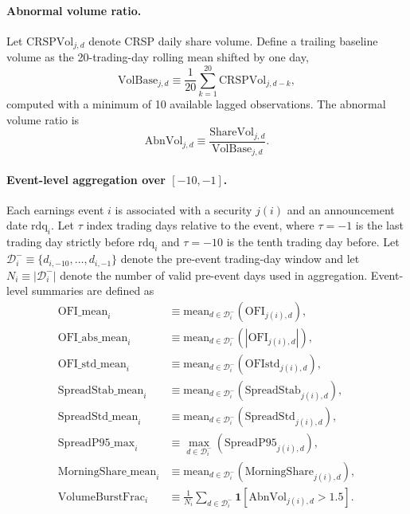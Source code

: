 \paragraph{Abnormal volume ratio.}
Let $\mathrm{CRSPVol}_{j,d}$ denote CRSP daily share volume.
Define a trailing baseline volume as the 20-trading-day rolling mean shifted by one day,
\begin{equation}
\mathrm{VolBase}_{j,d} \equiv \frac{1}{20}\sum_{k=1}^{20} \mathrm{CRSPVol}_{j,d-k},
\end{equation}
computed with a minimum of 10 available lagged observations.
The abnormal volume ratio is
\begin{equation}
\mathrm{AbnVol}_{j,d} \equiv \frac{\mathrm{ShareVol}_{j,d}}{\mathrm{VolBase}_{j,d}}.
\end{equation}

\paragraph{Event-level aggregation over $[-10,-1]$.}
Each earnings event $i$ is associated with a security $j(i)$ and an announcement date $\mathrm{rdq}_i$.
Let $\tau$ index trading days relative to the event, where $\tau=-1$ is the last trading day strictly before $\mathrm{rdq}_i$ and $\tau=-10$ is the tenth trading day before.
Let $\mathcal{D}_i^{-}\equiv\{d_{i,-10},\ldots,d_{i,-1}\}$ denote the pre-event trading-day window and let $N_i\equiv|\mathcal{D}_i^{-}|$ denote the number of valid pre-event days used in aggregation.
Event-level summaries are defined as
\begin{equation}
\begin{aligned}
\mathrm{OFI\_mean}_i &\equiv \mathrm{mean}_{d\in\mathcal{D}_i^{-}}\!\left(\mathrm{OFI}_{j(i),d}\right), \\
\mathrm{OFI\_abs\_mean}_i &\equiv \mathrm{mean}_{d\in\mathcal{D}_i^{-}}\!\left(|\mathrm{OFI}_{j(i),d}|\right), \\
\mathrm{OFI\_std\_mean}_i &\equiv \mathrm{mean}_{d\in\mathcal{D}_i^{-}}\!\left(\mathrm{OFIstd}_{j(i),d}\right), \\
\mathrm{SpreadStab\_mean}_i &\equiv \mathrm{mean}_{d\in\mathcal{D}_i^{-}}\!\left(\mathrm{SpreadStab}_{j(i),d}\right), \\
\mathrm{SpreadStd\_mean}_i &\equiv \mathrm{mean}_{d\in\mathcal{D}_i^{-}}\!\left(\mathrm{SpreadStd}_{j(i),d}\right), \\
\mathrm{SpreadP95\_max}_i &\equiv \max_{d\in\mathcal{D}_i^{-}}\!\left(\mathrm{SpreadP95}_{j(i),d}\right), \\
\mathrm{MorningShare\_mean}_i &\equiv \mathrm{mean}_{d\in\mathcal{D}_i^{-}}\!\left(\mathrm{MorningShare}_{j(i),d}\right), \\
\mathrm{VolumeBurstFrac}_i &\equiv \frac{1}{N_i}\sum_{d\in\mathcal{D}_i^{-}} \mathbf{1}\!\left[\mathrm{AbnVol}_{j(i),d}>1.5\right].
\end{aligned}
\end{equation}

